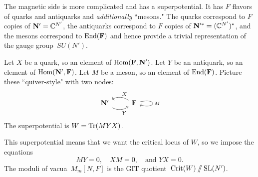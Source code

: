 \documentclass[11pt]{amsart}
\begin{document}
The magnetic side is more complicated and has a superpotential. 
It has $F$ flavors of quarks and antiquarks and {\it additionally} ``mesons." 
The quarks correspond to $F$ copies of $\mathbf N' = \mathbb C^{N'}$, 
the antiquarks correspond to $F$ copies of $\mathbf N'^*= (\mathbb C^{N'})^*$, 
and the mesons correspond to ${\rm End}(\mathbf F)$ 
and hence provide a trivial representation of the gauge group~$SU(N')$. 

Let $X$ be a quark, so an element of ${\rm Hom}(\mathbf F, \mathbf N')$.
Let $Y$ be an antiquark, so an element of ${\rm Hom}(\mathbf N', \mathbf F)$.
Let $M$ be a meson, so an element of ${\rm End}(\mathbf F)$.
Picture these ``quiver-style" with two nodes: 
\[
\begin{tikzcd}
\bN' \arrow[r, bend right, "Y"'] & \bF \arrow[l, bend right, "X"'] \arrow[loop right, looseness=15, "M"]
\end{tikzcd}
\]
The superpotential is $W=\operatorname{Tr}(MYX)$.

This superpotential means that we want the critical locus of $W$, 
so we impose the equations 
\[
MY = 0, \quad XM = 0, \quad \text{and } YX = 0. 
\]
The moduli of vacua~$M_m[N,F]$ is the GIT quotient~$\operatorname{Crit}(W)\mathbin{/\mkern-6mu/} \operatorname{SL}(N')$. 
\end{document}
